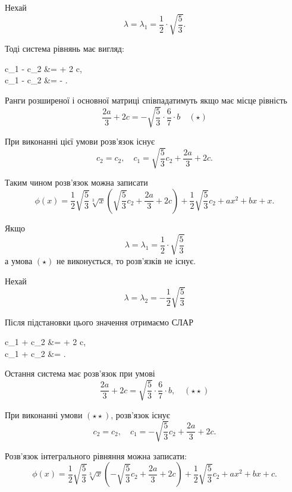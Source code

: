 \begin{solution}
	Нехай 
	\begin{equation*}
		\lambda = \lambda_1 = \frac{1}{2} \cdot \sqrt{\frac{5}{3}}.
	\end{equation*}
	
	Тоді система рівнянь має вигляд:
	\begin{system*}
		c_1 -  c_2 &=  + 2 c, \\
		c_1 -  c_2 &= -  .
	\end{system*}

	Ранги розширеної і основної матриці співпадатимуть якщо має місце рівність
	\begin{equation*}
		\frac{2a}{3} + 2c = -\sqrt{\frac{5}{3}} \cdot \frac{6}{7} \cdot b \quad (\star)
	\end{equation*}

	При виконанні цієї умови розв'язок існує
	\begin{equation*}
		c_2 = c_2, \quad c_1 = \sqrt{\frac{5}{3}} c_2 + \frac{2a}{3} + 2c.
	\end{equation*}

	Таким чином розв'язок можна записати
	\begin{equation*}
		\phi(x) = \dfrac{1}{2} \sqrt{\dfrac{5}{3}} \sqrt[3]{x} \left( \sqrt{\dfrac{5}{3}} c_2 + \dfrac{2a}{3} + 2c \right) + \dfrac{1}{2} \sqrt{\dfrac{5}{3}} c_2 + ax^2 + bx + x.
	\end{equation*}

	Якщо
	\begin{equation*}
		\lambda = \lambda_1 = \frac{1}{2} \cdot \sqrt{\frac{5}{3}}
	\end{equation*}
	а умова $(\star)$ не виконується, то розв'язків не існує. \medskip

	Нехай
	\begin{equation*}
		\lambda = \lambda_2 = - \frac{1}{2} \sqrt{\frac{5}{3}}
	\end{equation*}

	Після підстановки цього значення отримаємо СЛАР
	\begin{system*}
		c_1 +  c_2 &=  + 2 c, \\
		c_1 +  c_2 &=  \dfrac{6b}{7}.
	\end{system*}

	Остання система має розв'язок при умові
	\begin{equation*}
		\frac{2a}{3} + 2c = \sqrt{\frac{5}{3}} \cdot \frac{6}{7} \cdot b, \quad (\star\star)
	\end{equation*}

	При виконанні умови $(\star\star)$, розв'язок існує
	\begin{equation*}
		c_2 = c_2, \quad c_1 = - \sqrt{\frac{5}{3}} c_2 + \frac{2a}{3} + 2c.
	\end{equation*}

	Розв'язок інтегрального рівняння можна записати:
	\begin{equation*}
		\phi(x) = \dfrac{1}{2} \sqrt{\dfrac{5}{3}} \sqrt[3]{x} \left( -\sqrt{\dfrac{5}{3}} c_2 + \dfrac{2a}{3} + 2c \right) + \dfrac{1}{2} \sqrt{\dfrac{5}{3}} c_2 + ax^2 + bx + c.
	\end{equation*}
\end{solution}
